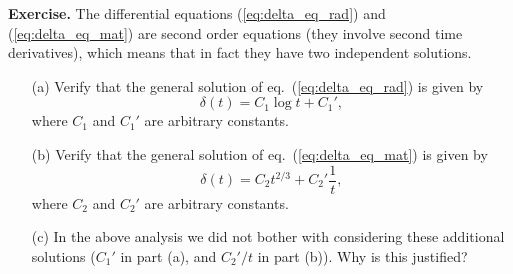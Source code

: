 \par\vspace{\baselineskip}

{\bf Exercise.} The differential equations (\ref{eq:delta_eq_rad}) and (\ref{eq:delta_eq_mat}) are second order equations (they involve second time derivatives), which means that in fact they have two independent solutions.
\begin{itemize}
\item [(a)] Verify that the general solution of eq.\ (\ref{eq:delta_eq_rad}) is given by
\begin{equation}
\delta(t)=C_1\log t+C_1',
\end{equation}
where $C_1$ and $C_1'$ are arbitrary constants.
\item [(b)] Verify that the general solution of eq.\ (\ref{eq:delta_eq_mat}) is given by
\begin{equation}
\delta(t)=C_2t^{2/3}+C_2'\frac{1}{t},
\end{equation}
where $C_2$ and $C_2'$ are arbitrary constants.
\item [(c)] In the above analysis we did not bother with considering these additional solutions ($C_1'$ in part (a), and $C_2'/t$ in part (b)). Why is this justified?
\end{itemize}

\par\vspace{\baselineskip}

